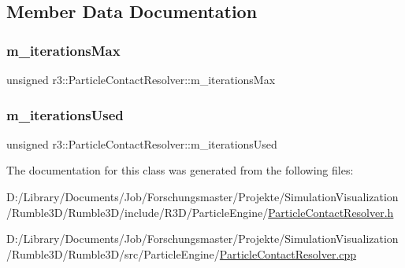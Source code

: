 \subsection{Member Data Documentation}
\mbox{\label{classr3_1_1_particle_contact_resolver_a4533db9c8dc455ad5b8c8f9e37db5392}} 
\subsubsection{\texorpdfstring{m\+\_\+iterations\+Max}{m\_iterationsMax}}
{\footnotesize\ttfamily unsigned r3\+::\+Particle\+Contact\+Resolver\+::m\+\_\+iterations\+Max\hspace{0.3cm}{\ttfamily [protected]}}

\mbox{\label{classr3_1_1_particle_contact_resolver_a07536069a9a6a73c45794baf8579b845}} 
\subsubsection{\texorpdfstring{m\+\_\+iterations\+Used}{m\_iterationsUsed}}
{\footnotesize\ttfamily unsigned r3\+::\+Particle\+Contact\+Resolver\+::m\+\_\+iterations\+Used\hspace{0.3cm}{\ttfamily [protected]}}



The documentation for this class was generated from the following files\+:\begin{DoxyCompactItemize}
\item 
D\+:/\+Library/\+Documents/\+Job/\+Forschungsmaster/\+Projekte/\+Simulation\+Visualization/\+Rumble3\+D/\+Rumble3\+D/include/\+R3\+D/\+Particle\+Engine/\mbox{\hyperlink{_particle_contact_resolver_8h}{Particle\+Contact\+Resolver.\+h}}\item 
D\+:/\+Library/\+Documents/\+Job/\+Forschungsmaster/\+Projekte/\+Simulation\+Visualization/\+Rumble3\+D/\+Rumble3\+D/src/\+Particle\+Engine/\mbox{\hyperlink{_particle_contact_resolver_8cpp}{Particle\+Contact\+Resolver.\+cpp}}\end{DoxyCompactItemize}
